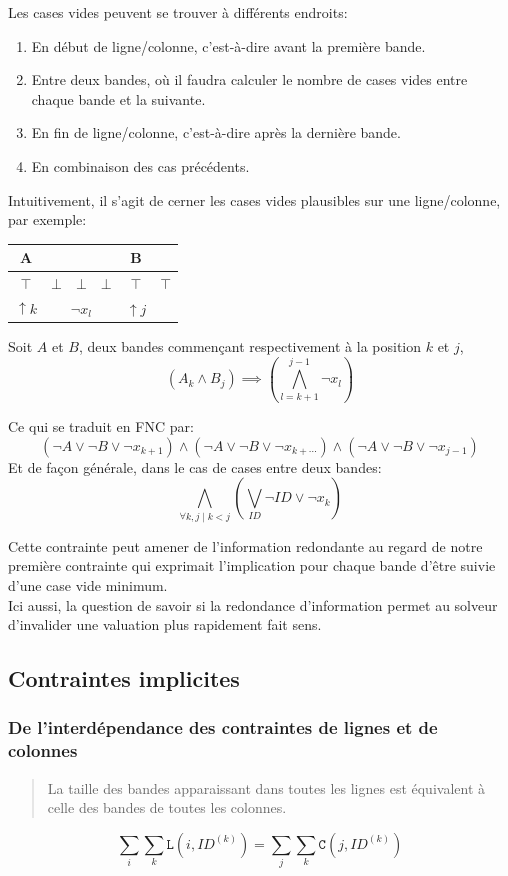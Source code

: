 \documentclass[a4paper,12pt]{report}
\newcommand\black{\cellcolor{black}}
\begin{document}
Les cases vides peuvent se trouver à différents endroits:
\begin{enumerate}
\item En début de ligne/colonne, c'est-à-dire avant la première bande.
\item Entre deux bandes, où il faudra calculer le nombre de cases vides entre chaque bande et la suivante.
\item En fin de ligne/colonne, c'est-à-dire après la dernière bande.
\item En combinaison des cas précédents.\\
\end{enumerate}
Intuitivement, il s'agit de cerner les cases vides plausibles sur une ligne/colonne, par exemple:		
			\begin{center}						
			\begin{tabular}{|c|c|c|c|c|c|}
			\hline 
			\black \color{white}A  &   &    &   & \black \color{white} B & \black   \\ 			
			\hline 
			$\top$ & $\bot$ & $\bot$  & $\bot$ & $\top$ & $\top$ \\ 
			\hline  
			$\uparrow k$ & \multicolumn{3}{c|}{$\lnot x_l$} & $\uparrow j$ & \\ 
			\hline
			\end{tabular}
			\end{center}
Soit $A$ et $B$, deux bandes commençant respectivement à la position $k$ et $j$,
$$( A_k \wedge B_j ) \implies (\bigwedge_{l=k+1}^{j-1} \lnot x_l)$$

Ce qui se traduit en FNC par:
$$(\lnot A\vee \lnot B \vee \lnot x_{k+1})\wedge(\lnot A \vee \lnot B \vee \lnot x_{k+\cdots})\wedge(\lnot A\vee \lnot B\vee \lnot x_{j-1})$$
Et de façon générale, dans le cas de cases entre deux bandes:
$$ \bigwedge_{\forall k,j\; | \;k<j} \left( \bigvee_{ID} \lnot ID \vee \lnot x_k \right) $$


Cette contrainte peut amener de l'information redondante au regard de notre première contrainte qui exprimait l'implication pour chaque bande d'être suivie d'une case vide minimum. \\ Ici aussi, la question de savoir si la redondance d'information permet au solveur d'invalider une valuation plus rapidement fait sens.

\subsection{Contraintes implicites}
\subsubsection{De l'interdépendance des contraintes de lignes et de colonnes}
\begin{quote}
 La taille des bandes apparaissant dans toutes les lignes est équivalent à celle des bandes de toutes les colonnes.	\\	
\end{quote}
$$\sum_i \sum_k \mathtt{L}(i,ID^{(k)}) = \sum_j \sum_k \mathtt{C}(j,ID^{(k)})$$
\end{document}
